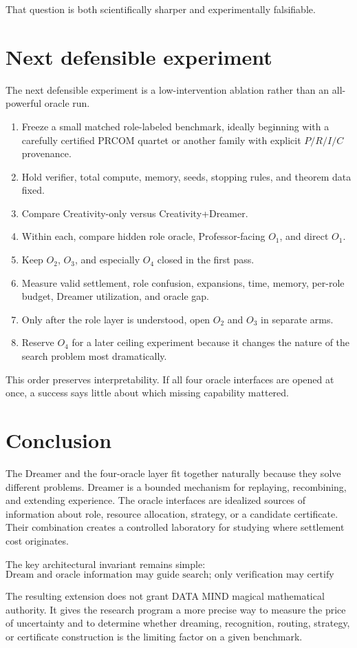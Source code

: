 That question is both scientifically sharper and experimentally falsifiable.

\section{Next defensible experiment}

The next defensible experiment is a low-intervention ablation rather than an all-powerful oracle run.

\begin{enumerate}[leftmargin=2em]
\item Freeze a small matched role-labeled benchmark, ideally beginning with a carefully certified PRCOM quartet or another family with explicit $P/R/I/C$ provenance.
\item Hold verifier, total compute, memory, seeds, stopping rules, and theorem data fixed.
\item Compare Creativity-only versus Creativity+Dreamer.
\item Within each, compare hidden role oracle, Professor-facing $O_1$, and direct $O_1$.
\item Keep $O_2$, $O_3$, and especially $O_4$ closed in the first pass.
\item Measure valid settlement, role confusion, expansions, time, memory, per-role budget, Dreamer utilization, and oracle gap.
\item Only after the role layer is understood, open $O_2$ and $O_3$ in separate arms.
\item Reserve $O_4$ for a later ceiling experiment because it changes the nature of the search problem most dramatically.
\end{enumerate}

This order preserves interpretability. If all four oracle interfaces are opened at once, a success says little about which missing capability mattered.

\section{Conclusion}

The Dreamer and the four-oracle layer fit together naturally because they solve different problems. Dreamer is a bounded mechanism for replaying, recombining, and extending experience. The oracle interfaces are idealized sources of information about role, resource allocation, strategy, or a candidate certificate. Their combination creates a controlled laboratory for studying where settlement cost originates.

The key architectural invariant remains simple:
\begin{equation}
\boxed{
\text{Dream and oracle information may guide search; only verification may certify mathematics.}
}
\end{equation}

The resulting extension does not grant DATA MIND magical mathematical authority. It gives the research program a more precise way to measure the price of uncertainty and to determine whether dreaming, recognition, routing, strategy, or certificate construction is the limiting factor on a given benchmark.

